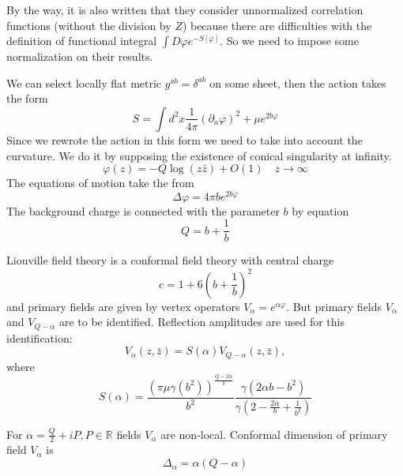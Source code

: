 \documentclass[12pt]{article}
\begin{document}
By the way, it is also written that they consider unnormalized correlation functions (without the
division by $Z$) because there are difficulties with the definition of functional integral $\int
D\varphi e^{-S[\varphi]}$. 
So we need to impose some normalization on their results. 

We can select locally flat metric $g^{ab}=\delta^{ab}$ on some sheet, then the action takes the form
\begin{equation}
  \label{eq:14}
  S= \int d^{2}x \frac{1}{4\pi} (\partial_{a} \varphi)^{2}+\mu e^{2b\varphi}
\end{equation}
Since we rewrote the action in this form we need to take into account the curvature. We do it by
supposing the existence of conical singularity at infinity.
\begin{equation}
  \label{eq:15}
  \varphi(z)=-Q \log (z\bar z)+O(1) \quad z\to\infty
\end{equation}
The equations of motion take the from
\begin{equation}
  \label{eq:18}
  \Delta \varphi = 4\pi b e^{2b\varphi}
\end{equation}
The background charge is connected with the parameter $b$ by equation
\begin{equation}
  \label{eq:20}
  Q=b+\frac{1}{b}
\end{equation}

Liouville field theory is a conformal field theory with central charge
\begin{equation}
  \label{eq:19}
  c=1+6\left(b+\frac{1}{b}\right)^{2}
\end{equation}
and primary fields are given by vertex operators $V_{\alpha}=e^{\alpha\varphi}$. But primary fields
$V_{\alpha}$ and $V_{Q-\alpha}$ are to be identified. 
Reflection amplitudes are used for this identification:
\begin{equation}
  \label{eq:87}
  V_{\alpha}(z,\bar z)=S(\alpha) V_{Q-\alpha}(z,\bar z),
\end{equation}
where
\begin{equation}
  \label{eq:88}
  S(\alpha)=\frac{\left(\pi\mu\gamma(b^{2})\right)^{\frac{Q-2\alpha}{b}}}{b^{2}}
  \frac{\gamma(2\alpha b -b^{2})}{\gamma\left(2-\frac{2\alpha}{b}+\frac{1}{b^{2}}\right)}
\end{equation}


For $\alpha=\frac{Q}{2}+i P, P\in \mathbb{R}$
fields $V_{\alpha}$ are non-local. Conformal dimension of primary field $V_{\alpha}$ is
\begin{equation}
  \label{eq:32}
  \Delta_{\alpha}=\alpha(Q-\alpha)
\end{equation}
\end{document}
